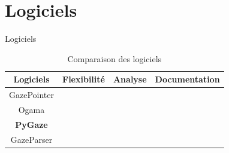 \documentclass{beamer}
\newcommand{\cmark}{\ding{51}}
\newcommand{\xmark}{\ding{55}}
\begin{document}
\section{Logiciels}
\begin{frame}{Logiciels}
  \begin{table}[htpb]
    \begin{center}
      \begin{tabular}{|c||c|c|c|}
        \hline
        Logiciels       & Flexibilité                               & Analyse                                   & Documentation                             \\
        \hline
        GazePointer     & \textcolor{red}{\xmark}                   & \textcolor{orange}{\cmark}                & \textcolor{orange}{\cmark}                \\
        Ogama           & \textcolor{red}{\xmark}                   & \textcolor{mediumseagreen}{\cmark \cmark} & \textcolor{orange}{\cmark}                \\
        \textbf{PyGaze} & \textcolor{mediumseagreen}{\cmark \cmark} & \textcolor{mediumseagreen}{\cmark \cmark} & \textcolor{mediumseagreen}{\cmark \cmark} \\
        GazeParser      & \textcolor{orange}{\cmark}                & \textcolor{mediumseagreen}{\cmark \cmark} & \textcolor{orange}{\cmark}                \\
        \hline
      \end{tabular}
      \caption{Comparaison des logiciels}
    \end{center}
  \end{table}
\end{frame}
\end{document}
